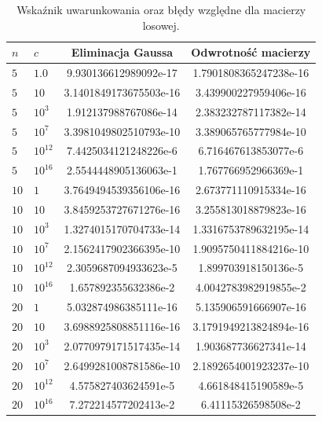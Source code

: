 \documentclass{classrep}
\begin{document}
		
		\begin{table}[!h]
        	\centering
        	\footnotesize
			\begin{tabular}{l|l|S|S} \toprule
				{$n$} & {$c$} & {Eliminacja Gaussa} & {Odwrotność macierzy} \\ \midrule
				$5$ & $1.0$ & 9.930136612989092e-17 & 1.7901808365247238e-16 \\ 
	 			$5$ & $10$ & 3.1401849173675503e-16 & 3.439900227959406e-16 \\
	 			$5$ & $10^3$ & 1.912137988767086e-14 & 2.383232787117382e-14 \\
	 			$5$ & $10^7$ & 3.3981049802510793e-10 & 3.389065765777984e-10 \\
	 			$5$ & $10^{12}$ & 7.4425034121248226e-6 & 6.716467613853077e-6 \\ 
	 			$5$ & $10^{16}$ & 2.5544448905136063e-1 & 1.767766952966369e-1 \\
	 			$10$ & $1$ & 3.7649494539356106e-16 & 2.673771110915334e-16 \\
	 			$10$ & $10$ & 3.8459253727671276e-16 & 3.255813018879823e-16 \\ 
	 			$10$ & $10^3$  & 1.3274015170704733e-14 & 1.3316753789632195e-14 \\
	 			$10$ & $10^7$ & 2.1562417902366395e-10 & 1.9095750411884216e-10 \\
	 			$10$ & $10^{12}$ & 2.3059687094933623e-5 & 1.899703918150136e-5 \\ 
	 			$10$ & $10^{16}$ & 1.657892355632386e-2 & 4.0042783982919855e-2 \\
	 			$20$ & $1$ & 5.032874986385111e-16 & 5.135906591666907e-16 \\ 
	 			$20$ & $10$ & 3.6988925808851116e-16 & 3.1791949213824894e-16 \\
	 			$20$ & $10^3$ & 2.0770979171517435e-14 & 1.903687736627341e-14 \\
	 			$20$ & $10^7$ & 2.6499281008781586e-10 & 2.1892654001923237e-10 \\ 
	 			$20$ & $10^{12}$ & 4.575827403624591e-5 & 4.661848415190589e-5 \\
	 			$20$ & $10^{16}$  & 7.272214577202413e-2 & 6.41115326598508e-2 \\ \bottomrule
	 		\end{tabular}
	 		\caption{Wskaźnik uwarunkowania oraz błędy względne dla macierzy losowej.}
			\label{table:3}
		\end{table}	
\end{document}

